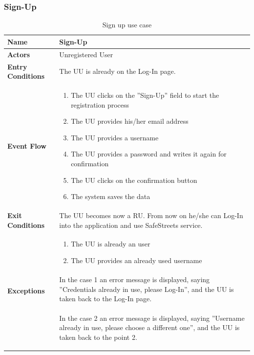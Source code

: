 				\subsubsection{Sign-Up}
					\begin{table}[!h]
						\centering
						\begin{tabular}{lp{}}
							\toprule
							\textbf{Name} & \textbf{Sign-Up} \\[1mm]
							\midrule
							\textbf{Actors} & Unregistered User \\[1mm]
							\textbf{Entry Conditions} & The UU is already on the Log-In page. \vspace{1mm}\\
							\textbf{Event Flow} &
							\vspace{-5mm} 
							\begin{enumerate}
								\setlength\itemsep{0.5mm}
								\item The UU clicks on the ''Sign-Up'' field to start the registration process
								\item The UU provides his/her email address
								\item The UU provides a username
								\item The UU provides a password and writes it again for confirmation
								\item The UU clicks on the confirmation button
								\item The system saves the data
							\end{enumerate} \\
							\textbf{Exit Conditions} & The UU becomes now a RU. From now on he/she can Log-In into the  application and use SafeStreets service. \vspace{1mm}\\
							
							\textbf{Exceptions} &
							\vspace{-5mm} 
							\begin{enumerate}
								\item The UU is already an user
								\item The UU provides an already used username
							\end{enumerate}
							\vspace{-7mm}
							\paragraph{}
								In the case 1 an error message is displayed, saying ''Credentials already in use,  please Log-In'', and the UU is taken back to the Log-In page.
							\paragraph{}
							\vspace{-4mm}
								In the case 2 an error message is displayed, saying ''Username already in use, please choose a different one'', and the UU is taken back to the point 2. \\[1mm]
							\bottomrule
						\end{tabular}
						\caption{Sign up use case}
					\end{table}
					\clearpage
					\vspace{-5mm}
